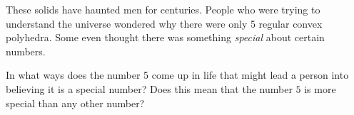 These solids have haunted men for centuries. People who were trying to
understand the universe wondered why there were
only 5 regular convex polyhedra. Some even thought there was something
\textit{special} about certain numbers.

\begin{ques}
In what ways does the number 5 come up in life that might lead a
person into believing it is a special number? Does this mean that the
number $5$ is more special than any other number?
\end{ques}
\QM

%
%

\newpage


